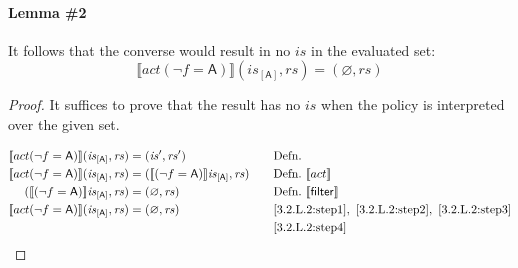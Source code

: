 \documentclass[12pt, letterpaper]{article}
\let\emptyset\varnothing
\newcommand\interp[1]{\llbracket #1 \rrbracket}
\begin{document}
 \paragraph{Lemma \#2}
     It follows that the converse would result in no $\mathit{is}$ in the evaluated set:
 \[
     \interp{ act(\neg f=\mathsf{A}) } (\mathit{is}_{[\mathsf{A}]}, \mathit{rs}) = (\emptyset, \mathit{rs})
 \]
 \begin{proof}
     It suffices to prove that the result has no $\mathit{is}$ when the policy is interpreted over the given set.
     \par\nobreak
     {\fontsize{10pt}{12pt}\selectfont
     \begin{alignat}{2}
         \setcounter{equation}{0}
         \label{3.2.L.2:step1}
         \interp{ act(\neg f=\mathsf{A}) } (\mathit{is}_{[\mathsf{A}]}, \mathit{rs})
         &= 
         (\mathit{is}', \mathit{rs}')
         &&\quad \text{Defn.}
         \\
         \label{3.2.L.2:step2}
         \interp{ act(\neg f=\mathsf{A}) } (\mathit{is}_{[\mathsf{A}]}, \mathit{rs})
         &= 
         (\interp{ (\neg f=\mathsf{A}) } \mathit{is}_{[\mathsf{A}]}, \mathit{rs})
         &&\quad \text{Defn.}\ \interp{act}\\
         \label{3.2.L.2:step3}
         (\interp{ (\neg f=\mathsf{A}) } \mathit{is}_{[\mathsf{A}]}, \mathit{rs})
         &=
         (\emptyset, \mathit{rs})
         &&\quad \text{Defn.}\ \interp{\mathsf{filter}}\\
         \label{3.2.L.2:step4}
         \interp{ act(\neg f=\mathsf{A}) } (\mathit{is}_{[\mathsf{A}]}, \mathit{rs})
         &=
         (\emptyset, \mathit{rs})
         &&\quad \ref{3.2.L.2:step1},\ \ref{3.2.L.2:step2},\ \ref{3.2.L.2:step3}\\
         \label{3.2.L.2:qed}
         &\qedhere
         &&\quad \ref{3.2.L.2:step4}
     \end{alignat}
     }%
 \end{proof}
\end{document}
